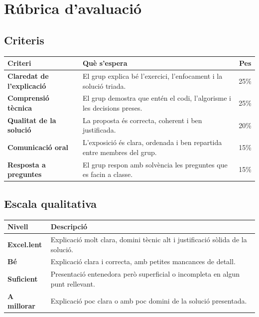 \documentclass[12pt,a4paper]{report}
\begin{document}
\chapter{Rúbrica d'avaluació}

\section{Criteris}

\begin{center}
\begin{tabularx}{\textwidth}{>{\bfseries}l Y c}
\toprule
Criteri & Què s'espera & Pes \\
\midrule
Claredat de l'explicació & El grup explica bé l'exercici, l'enfocament i la solució triada. & 25\% \\
Comprensió tècnica & El grup demostra que entén el codi, l'algorisme i les decisions preses. & 25\% \\
Qualitat de la solució & La proposta és correcta, coherent i ben justificada. & 20\% \\
Comunicació oral & L'exposició és clara, ordenada i ben repartida entre membres del grup. & 15\% \\
Resposta a preguntes & El grup respon amb solvència les preguntes que es facin a classe. & 15\% \\
\bottomrule
\end{tabularx}
\end{center}

\section{Escala qualitativa}

\begin{center}
\begin{tabularx}{0.94\textwidth}{>{\bfseries}l Y}
\toprule
Nivell & Descripció \\
\midrule
Excel.lent & Explicació molt clara, domini tècnic alt i justificació sòlida de la solució. \\
Bé & Explicació clara i correcta, amb petites mancances de detall. \\
Suficient & Presentació entenedora però superficial o incompleta en algun punt rellevant. \\
A millorar & Explicació poc clara o amb poc domini de la solució presentada. \\
\bottomrule
\end{tabularx}
\end{center}
\end{document}
